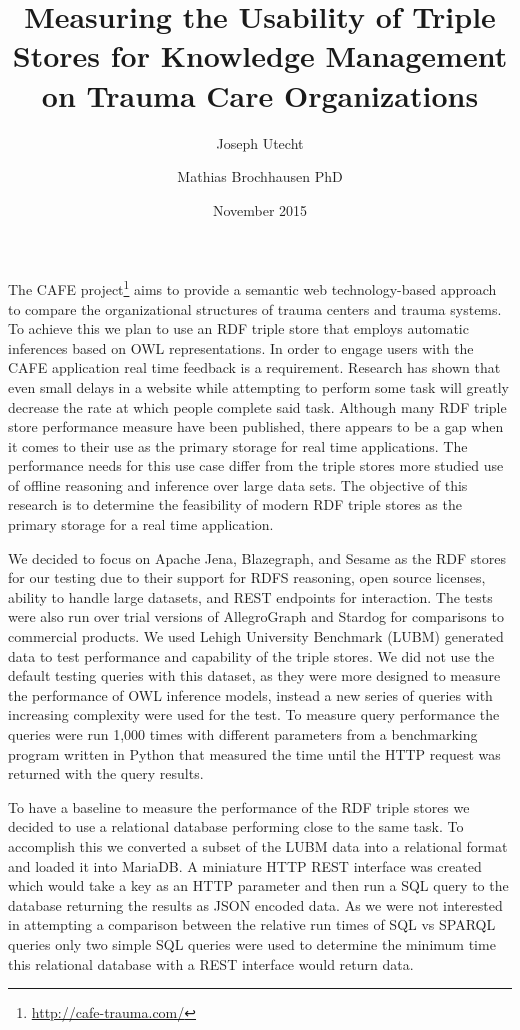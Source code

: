 \documentclass{llncs}
\title{Measuring the Usability of Triple Stores for Knowledge Management on Trauma Care Organizations}
\author{Joseph Utecht \and Mathias Brochhausen PhD}
\institute{Department of Biomedical Informatics, University of Arkansas for Medical Sciences, Little Rock, AR}
\date{November 2015}
\begin{document}
\maketitle

The CAFE project\footnote{\url{http://cafe-trauma.com/}} aims to provide a semantic web technology-based approach to compare the organizational structures of trauma centers and trauma systems. To achieve this we plan to use an RDF triple store that employs automatic inferences based on OWL representations. In order to engage users with the CAFE application real time feedback is a requirement. Research has shown that even small delays in a website while attempting to perform some task will greatly decrease the rate at which people complete said task\cite{Galletta2002}. Although many RDF triple store performance measure have been published, there appears to be a gap when it comes to their use as the primary storage for real time applications. The performance needs for this use case differ from the triple stores more studied use of offline reasoning and inference over large data sets. The objective of this research is to determine the feasibility of modern RDF triple stores as the primary storage for a real time application.

We decided to focus on Apache Jena, Blazegraph, and Sesame as the RDF stores for our testing due to their support for RDFS reasoning, open source licenses, ability to handle large datasets, and REST endpoints for interaction. The tests were also run over trial versions of AllegroGraph and Stardog for comparisons to commercial products. We used Lehigh University Benchmark (LUBM)\cite{Guo2005} generated data to test performance and capability of the triple stores.  We did not use the default testing queries with this dataset, as they were more designed to measure the performance of OWL inference models, instead a new series of queries with increasing complexity were used for the test. To measure query performance the queries were run 1,000 times with different parameters from a benchmarking program written in Python that measured the time until the HTTP request was returned with the query results.

To have a baseline to measure the performance of the RDF triple stores we decided to use a relational database performing close to the same task.  To accomplish this we converted a subset of the LUBM data into a relational format and loaded it into MariaDB. A miniature HTTP REST interface was created which would take a key as an HTTP parameter and then run a SQL query to the database returning the results as JSON encoded data. As we were not interested in attempting a comparison between the relative run times of SQL vs SPARQL queries only two simple SQL queries were used to determine the minimum time this relational database with a REST interface would return data.
\end{document}
